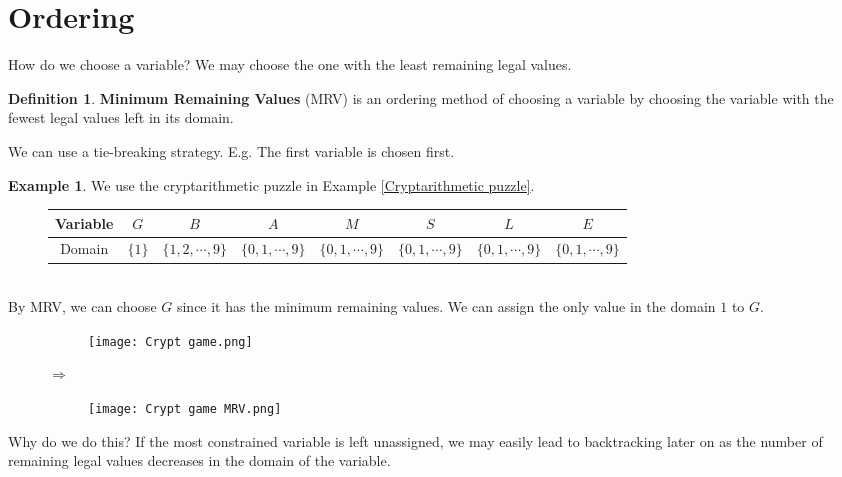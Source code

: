 \documentclass{article}
\theoremstyle{definition}
\newtheorem{definition}{Definition}[section]
\newtheorem{example}{Example}[definition]
\begin{document}
\newpage
\section{Ordering}
How do we choose a variable? We may choose the one with the least remaining legal values.
\begin{definition}
	\textbf{Minimum Remaining Values} (MRV) is an ordering method of choosing a variable by choosing the variable with the fewest legal values left in its domain.
\end{definition}
 We can use a tie-breaking strategy. E.g. The first variable is chosen first.
\begin{example}
	\label{MRV}
	We use the cryptarithmetic puzzle in Example \ref{Cryptarithmetic puzzle}.
	\begin{figure}[h]
		\centering
		\begin{tabular}{|c||c|c|c|c|c|c|c|}
			\hline
			Variable & $G$ & $B$ & $A$ & $M$ & $S$ & $L$ & $E$\\
			\hline
			Domain & $\{1\}$ & $\{1,2,\cdots,9\}$ & $\{0,1,\cdots,9\}$ & $\{0,1,\cdots,9\}$ & $\{0,1,\cdots,9\}$ & $\{0,1,\cdots,9\}$ & $\{0,1,\cdots,9\}$\\
			\hline
		\end{tabular}
	\end{figure}\\
	By MRV, we can choose $G$ since it has the minimum remaining values. We can assign the only value in the domain $1$ to $G$.
	\begin{figure}[h!]
		\centering
		\begin{subfigure}[h]{0.3\textwidth}
			\texttt{[image: Crypt game.png]}
		\end{subfigure}
		$\Longrightarrow$
		\begin{subfigure}[h]{0.3\textwidth}
			\texttt{[image: Crypt game MRV.png]}
		\end{subfigure}
	\end{figure}
\end{example}
Why do we do this? If the most constrained variable is left unassigned, we may easily lead to backtracking later on as the number of remaining legal values decreases in the domain of the variable.
\end{document}
